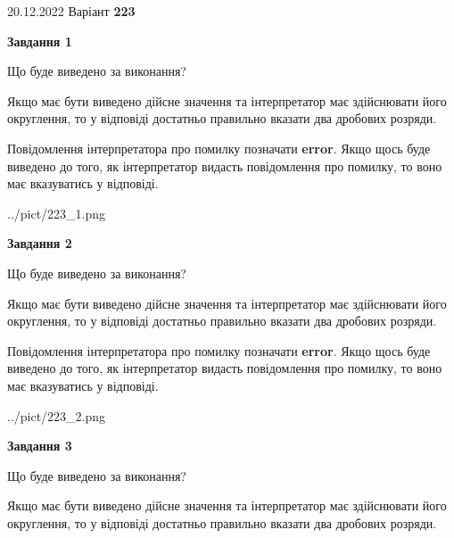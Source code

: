 \documentclass[12pt, ukrainian]{article}
\begin{document}
{20.12.2022 Варіант \No \textbf { 223 }\par}
{
\begin {Large}

{\begin {center}\textbf{Завдання 1}\end {center}}\par
Що буде виведено за виконання? \par

Якщо має бути виведено дійсне значення та інтерпретатор має здійснювати його округлення, 
то у відповіді достатньо правильно вказати два дробових розряди.

Повідомлення інтерпретатора про помилку позначати \textbf{error}.
Якщо щось буде виведено до того, як інтерпретатор видасть повідомлення про помилку, 
то воно має вказуватись у відповіді. \par

\begin{center}
	{../pict/223_1.png}
\end{center}
\newpage

{\begin {center}\textbf{Завдання 2}\end {center}}\par
Що буде виведено за виконання? \par

Якщо має бути виведено дійсне значення та інтерпретатор має здійснювати його округлення, 
то у відповіді достатньо правильно вказати два дробових розряди.

Повідомлення інтерпретатора про помилку позначати \textbf{error}.
Якщо щось буде виведено до того, як інтерпретатор видасть повідомлення про помилку, 
то воно має вказуватись у відповіді. \par

\begin{center}
	{../pict/223_2.png}
\end{center}
\newpage

{\begin {center}\textbf{Завдання 3}\end {center}}\par
Що буде виведено за виконання? \par

Якщо має бути виведено дійсне значення та інтерпретатор має здійснювати його округлення, 
то у відповіді достатньо правильно вказати два дробових розряди.


\end{Large}}
\end{document}
